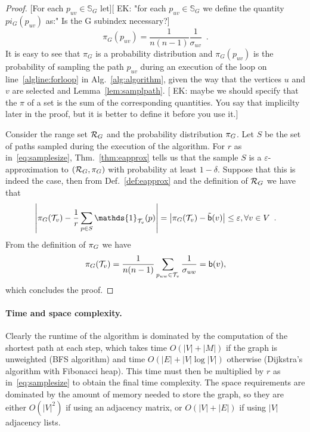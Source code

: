 \begin{proof}
  [For each $p_{uv}\in\mathbb{S}_G$ let][ EK: "for each $p_{uv}\in\mathbb{S}_G$ we define the quantity $pi_G(p_{uv})$ as:"
  Is the G subindex necessary?]
  \[
  \pi_G(p_{uv})=\frac{1}{n(n-1)}\frac{1}{\sigma_{uv}}\enspace.
  \]
  It is easy to see that $\pi_G$ is a probability distribution and
  $\pi_G(p_{uv})$ is the probability of sampling the path $p_{uv}$ during an
  execution of the loop on line~\ref{algline:forloop} in
  Alg.~\ref{alg:algorithm}, given the way that the vertices $u$ and $v$ are
  selected and Lemma~\ref{lem:samplpath}.
  [ EK: maybe we should specify that the $\pi$ of a set is the sum of the corresponding quantities.
  You say that implicilty later in the proof, but it is better to define it before you use it.]
  
  
  Consider the range set $\mathcal{R}_G$ and the probability distribution $\pi_G$.
  Let $S$ be the set of paths sampled during the execution of the algorithm.
  For $r$ as in~\eqref{eq:samplesize}, Thm.~\ref{thm:eapprox} tells us that the sample $S$ is a
  $\varepsilon$-approximation to $(\mathcal{R}_G,\pi_G)$ with probability at least
  $1-\delta$. Suppose that this is indeed the case, then from
  Def.~\ref{def:eapprox} and the definition of $\mathcal{R}_G$ we have that
  \[
  \left|\prob_G(\mathcal{T}_v) - \frac{1}{r}\sum_{p\in
  S}\mathds{1}_{\mathcal{T}_v}(p)\right|=\left|\prob_G(\mathcal{T}_v) -
  \tilde\betw(v)\right|\le\varepsilon, \forall v\in
  V\enspace.
  \]
  From the definition of $\pi_G$ we have
  \[
  \pi_G(\mathcal{T}_v)=\frac{1}{n(n-1)}\sum_{p_{uw}\in\mathcal{T}_v}\frac{1}{\sigma_{uw}}=\mathsf{b}(v),
  \]
  which concludes the proof.
\end{proof}

\ifproof
\paragraph{Time and space complexity.} Clearly the runtime of the algorithm is
dominated by the computation of the shortest path at each step, which takes time
$O(|V|+|M|)$ if the graph is unweighted (BFS algorithm) and time
$O(|E|+|V|\log|V|)$ otherwise (Dijkstra's algorithm with Fibonacci heap).
This time must then be multiplied by $r$ as in~\eqref{eq:samplesize} to obtain
the final time complexity. The space requirements are dominated by the amount of
memory needed to store the graph, so they are either $O(|V|^2)$ if using an
adjacency matrix, or $O(|V|+|E|)$ if using $|V|$ adjacency lists.
\fi

